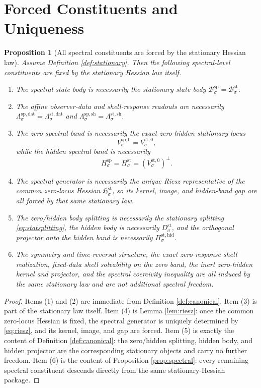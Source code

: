 \documentclass[11pt]{article}
\newcommand{\SpecBody}[1]{\mathcal B_{#1}^{\mathrm{sp}}}
\newcommand{\SpecData}[1]{\Lambda_{#1}^{\mathrm{sp,dat}}}
\newcommand{\SpecShell}[1]{\Lambda_{#1}^{\mathrm{sp,sh}}}
\newcommand{\SpecZero}[1]{V_{#1}^{\mathrm{sp},0}}
\newcommand{\SpecHidden}[1]{H_{#1}^{\mathrm{sp}}}
\newcommand{\StatBody}[1]{\mathcal B_{#1}^{\mathrm{st}}}
\newcommand{\StatData}[1]{\Lambda_{#1}^{\mathrm{st,dat}}}
\newcommand{\StatShell}[1]{\Lambda_{#1}^{\mathrm{st,sh}}}
\newcommand{\StatZero}[1]{V_{#1}^{\mathrm{st},0}}
\newcommand{\StatHidden}[1]{H_{#1}^{\mathrm{st}}}
\newcommand{\StatHiddenBody}[1]{D_{#1}^{\mathrm{st}}}
\newcommand{\StatProj}[1]{\Pi_{#1}^{\mathrm{st,hid}}}
\newcommand{\StatHess}[1]{\mathfrak H_{#1}^{\mathrm{st}}}
\newtheorem{proposition}{Proposition}
\begin{document}
\section{Forced Constituents and Uniqueness}

\begin{proposition}[All spectral constituents are forced by the stationary Hessian law]
\label{prop:forced}
Assume Definition \ref{def:stationary}. Then the following spectral-level constituents are fixed by the stationary Hessian law itself.
\begin{enumerate}
    \item The spectral state body is necessarily the stationary state body \(\SpecBody{\sigma}=\StatBody{\sigma}\).
    \item The affine observer-data and shell-response readouts are necessarily \(\SpecData{\sigma}=\StatData{\sigma}\) and \(\SpecShell{\sigma}=\StatShell{\sigma}\).
    \item The zero spectral band is necessarily the exact zero-hidden stationary locus
    \[
    \SpecZero{\sigma}=\StatZero{\sigma},
    \]
    while the hidden spectral band is necessarily
    \[
    \SpecHidden{\sigma}=\StatHidden{\sigma}=(\StatZero{\sigma})^{\perp}.
    \]
    \item The spectral generator is necessarily the unique Riesz representative of the common zero-locus Hessian \(\StatHess{\sigma}\), so its kernel, image, and hidden-band gap are all forced by that same stationary law.
    \item The zero/hidden body splitting is necessarily the stationary splitting \eqref{eq:statsplitting}, the hidden body is necessarily \(\StatHiddenBody{\sigma}\), and the orthogonal projector onto the hidden band is necessarily \(\StatProj{\sigma}\).
    \item The symmetry and time-reversal structure, the exact zero-response shell realization, fixed-data shell solvability on the zero band, the inert zero-hidden kernel and projector, and the spectral coercivity inequality are all induced by the same stationary law and are not additional spectral freedom.
\end{enumerate}
\end{proposition}

\begin{proof}
Items (1) and (2) are immediate from Definition \ref{def:canonical}. Item (3) is part of the stationary law itself. Item (4) is Lemma \ref{lem:riesz}: once the common zero-locus Hessian is fixed, the spectral generator is uniquely determined by \eqref{eq:riesz}, and its kernel, image, and gap are forced. Item (5) is exactly the content of Definition \ref{def:canonical}: the zero/hidden splitting, hidden body, and hidden projector are the corresponding stationary objects and carry no further freedom. Item (6) is the content of Proposition \ref{prop:spectral}: every remaining spectral constituent descends directly from the same stationary-Hessian package.
\end{proof}
\end{document}
